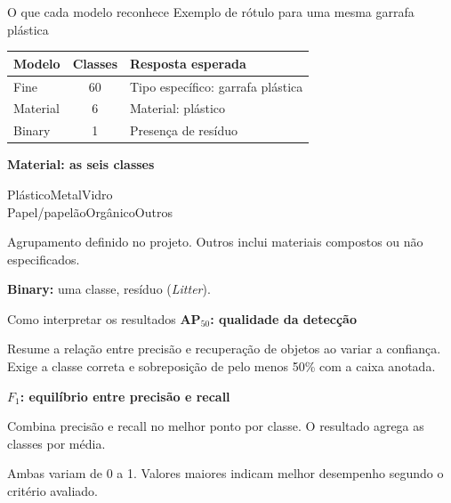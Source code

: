 \documentclass[aspectratio=169,10pt]{beamer}
\begin{document}
\begin{frame}{O que cada modelo reconhece}
  \vspace{0.09cm}
  {\fontsize{11.5}{14.8}\selectfont Exemplo de rótulo para uma mesma garrafa plástica}\par
  \vspace{0.18cm}
  \renewcommand{\arraystretch}{1.20}
  {\fontsize{10.7}{13.1}\selectfont
  \begin{tabular}{p{2.5cm}cp{6.5cm}}
    \toprule
    \textbf{Modelo} & \textbf{Classes} & \textbf{Resposta esperada} \\
    \midrule
    Fine & 60 & Tipo específico: garrafa plástica \\
    Material & 6 & Material: plástico \\
    Binary & 1 & Presença de resíduo \\
    \bottomrule
  \end{tabular}}\par
  \vspace{0.21cm}
  {\color{ufpidark}\fontsize{12}{15}\selectfont\bfseries Material: as seis classes}\par
  \vspace{0.10cm}
  {\fontsize{12}{16}\selectfont Plástico\quad Metal\quad Vidro\\
  Papel/papelão\quad Orgânico\quad Outros}\par
  \vspace{0.12cm}
  {\color{muted}\fontsize{9}{11.5}\selectfont Agrupamento definido no projeto. Outros inclui materiais compostos ou não especificados.}\par
  \vspace{0.18cm}
  {\fontsize{12}{15}\selectfont\textbf{Binary:} uma classe, resíduo (\textit{Litter}).}\par
\end{frame}

\begin{frame}{Como interpretar os resultados}
  \vspace{0.12cm}
  {\color{ufpidark}\fontsize{16.4}{19.7}\selectfont\bfseries AP$_{50}$: qualidade da detecção}\par
  \vspace{0.09cm}
  {\fontsize{11.5}{14.8}\selectfont Resume a relação entre precisão e recuperação de objetos ao variar a confiança. Exige a classe correta e sobreposição de pelo menos 50\% com a caixa anotada.}\par
  \vspace{0.27cm}
  {\color{ufpidark}\fontsize{16.4}{19.7}\selectfont\bfseries $F_1$: equilíbrio entre precisão e recall}\par
  \vspace{0.09cm}
  {\fontsize{11.5}{14.8}\selectfont Combina precisão e recall no melhor ponto por classe. O resultado agrega as classes por média.}\par
  \vspace{0.21cm}
  {\color{muted}\fontsize{9.8}{12.3}\selectfont Ambas variam de 0 a 1. Valores maiores indicam melhor desempenho segundo o critério avaliado.}
\end{frame}
\end{document}
